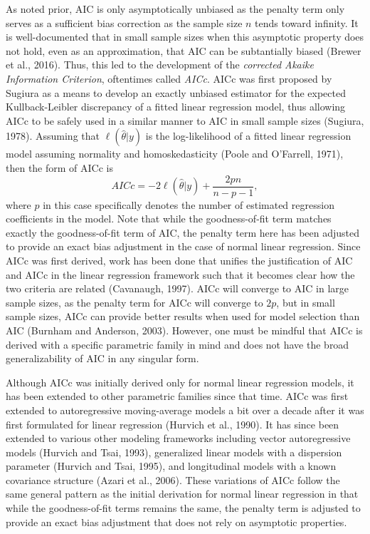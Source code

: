 		As noted prior, AIC is only asymptotically unbiased as the penalty term only serves as a sufficient bias correction as the sample size $n$ tends toward infinity. It is well-documented that
		in small sample sizes when this asymptotic property does not hold, even as an approximation, that AIC can be subtantially biased (Brewer et al., 2016). Thus, this led to the development of the 
		\textit{corrected Akaike Information Criterion}, oftentimes called \textit{AICc}. AICc was first proposed by Sugiura as a means to develop an exactly unbiased estimator for the expected
		Kullback-Leibler discrepancy of a fitted linear regression model, thus allowing AICc to be safely used in a similar manner to AIC in small sample sizes (Sugiura, 1978). Assuming that
		$\ell(\hat{\theta}|y)$ is the log-likelihood of a fitted linear regression model assuming normality and homoskedasticity (Poole and O'Farrell, 1971), then the form of AICc is 
		\begin{equation}
			AICc = -2 \ell(\hat{\theta}|y) + \frac{2 p n}{n - p - 1},
		\end{equation}
		where $p$ in this case specifically denotes the number of estimated regression coefficients in the model. Note that while the goodness-of-fit term matches exactly the goodness-of-fit term
		of AIC, the penalty term here has been adjusted to provide an exact bias adjustment in the case of  normal linear regression. Since AICc was first derived, work has been done that unifies
		the justification of AIC and AICc in the linear regression framework such that it becomes clear how the two criteria are related (Cavanaugh, 1997). AICc will converge to AIC in large sample
		sizes, as the penalty term for AICc will converge to $2p$, but in small sample sizes, AICc can provide better results when used for model selection than AIC (Burnham and Anderson, 2003).
		However, one must be mindful that AICc is derived with a specific parametric family in mind and does not have the broad generalizability of AIC in any singular form.

		Although AICc was initially derived only for normal linear regression models, it has been extended to other parametric families since that time. AICc was first extended to autoregressive
		moving-average models a bit over a decade after it was first formulated for linear regression (Hurvich et al., 1990). It has since been extended to various other modeling frameworks
		including vector autoregressive models (Hurvich and Tsai, 1993), generalized linear models with a dispersion parameter (Hurvich and Tsai, 1995), and longitudinal models with a known
		covariance structure (Azari et al., 2006). These variations of AICc follow the same general pattern as the initial derivation for normal linear regression in that while the goodness-of-fit
		terms remains the same, the penalty term is adjusted to provide an exact bias adjustment that does not rely on asymptotic properties.

